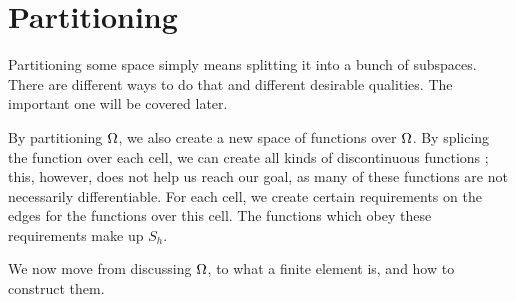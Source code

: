 \section{Partitioning}
Partitioning some space simply means splitting it into a bunch of subspaces. 
There are different ways to do that and different desirable qualities. 
The important one will be covered later.

By partitioning $\Omega$, we also create a new space of functions over $\Omega$. 
By splicing the function over each cell, we can create all kinds of 
discontinuous functions
; this, however, does not help us reach our goal, 
as many of these functions are not necessarily differentiable. 
For each cell, we create certain requirements on the edges for the functions 
over this cell. The functions which obey these requirements make up $S_h$.




We now move from discussing $\Omega$, to what a finite element is,
and how to construct them.